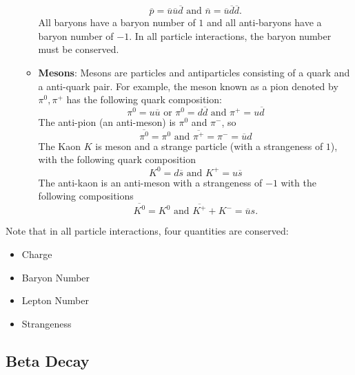 \begin{itemize}
\begin{itemize}
        \begin{equation*}
            \overline{p} = \overline{u}\overline{u}\overline{d} \text{ and } \overline{n} = \overline{u}\overline{d}\overline{d}.
        \end{equation*}
        All baryons have a baryon number of $1$ and all anti-baryons have a baryon number of $-1$. In all particle interactions, the baryon number must be conserved.
        \item \textbf{Mesons}: Mesons are particles and antiparticles consisting of a quark and a anti-quark pair. For example, the meson known as a pion denoted by $\pi^0, \pi^+$ has the following quark composition:
        \begin{equation*}
            \pi^0 = u \overline{u} \text{ or } \pi^0 = d \overline{d} \text{ and } \pi^+ = u \overline{d}  
        \end{equation*}
        The anti-pion (an anti-meson) is $\pi^0$ and $\pi^-$, so 
        \begin{equation*}
            \overline{\pi^0} = \pi^0 \text{ and } \overline{\pi^+} = \pi^- = \overline{u} d
        \end{equation*}
        The Kaon $K$ is meson and a strange particle (with a strangeness of $1$), with the following quark composition
        \begin{equation*}
            K^0 = d \overline{s} \text{ and } K^+ = u \overline{s}
        \end{equation*}
        The anti-kaon is an anti-meson with a strangeness of $-1$ with the following compositions
        \begin{equation*}
            \overline{K^0} = K^0 \text{ and } \overline{K^+} + K^- = \overline{u} s.
        \end{equation*}
    \end{itemize}
\end{itemize}

\noindent Note that in all particle interactions, four quantities are conserved:
\begin{itemize}
    \item Charge
    \item Baryon Number
    \item Lepton Number
    \item Strangeness 
\end{itemize}

\subsection{Beta Decay}

